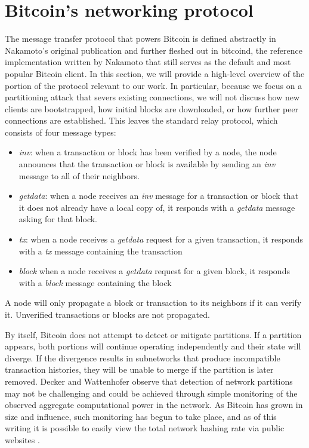 \section{Bitcoin's networking protocol}
The message transfer protocol that powers Bitcoin is defined abstractly in Nakamoto's original publication \cite{Nakamoto} and further fleshed out in bitcoind, the reference implementation written by Nakamoto that still serves as the default and most popular Bitcoin client. In this section, we will provide a high-level overview of the portion of the protocol relevant to our work. In particular, because we focus on a partitioning attack that severs existing connections, we will not discuss how new clients are bootstrapped, how initial blocks are downloaded, or how further peer connections are established. This leaves the standard relay protocol, which consists of four message types:

\begin{itemize}

\item \textit{inv}: when a transaction or block has been verified by a node, the node announces that the transaction or block is available by sending an \textit{inv} message to all of their neighbors.
\item \textit{getdata}: when a node receives an \textit{inv} message for a transaction or block that it does not already have a local copy of, it responds with a \textit{getdata} message asking for that block.
\item \textit{tx}: when a node receives a \textit{getdata} request for a given transaction, it responds with a \textit{tx} message containing the transaction
\item \textit{block} when a node receives a \textit{getdata} request for a given block, it responds with a \textit{block} message containing the block

\end{itemize}

A node will only propagate a block or transaction to its neighbors if it can verify it. Unverified transactions or blocks are not propagated.

By itself, Bitcoin does not attempt to detect or mitigate partitions. If a partition appears, both portions will continue operating independently and their state will diverge. If the divergence results in subnetworks that produce incompatible transaction histories, they will be unable to merge if the partition is later removed. Decker and Wattenhofer \cite{DeckerWattenhofer2013} observe that detection of network partitions may not be challenging and could be achieved through simple monitoring of the observed aggregate computational power in the network. As Bitcoin has grown in size and influence, such monitoring has begun to take place, and as of this writing it is possible to easily view the total network hashing rate via public websites \cite{sipa}.

